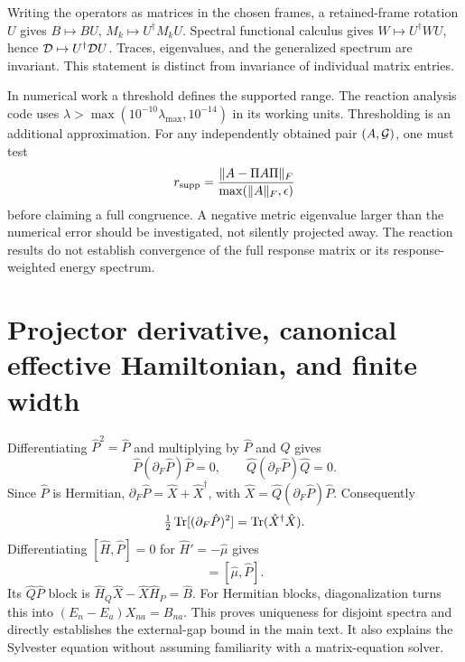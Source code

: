 \documentclass[aip,jcp,amsmath,amssymb,preprint,floatfix]{revtex4-1}
\begin{document}
Writing the operators as matrices in the chosen frames, a retained-frame rotation $U$ gives $B\mapsto BU$, $M_k\mapsto U^\dagger M_kU$. Spectral functional calculus gives $W\mapsto U^\dagger WU$, hence $\mathcal D\mapsto U^\dagger\mathcal D U$. Traces, eigenvalues, and the generalized spectrum are invariant. This statement is distinct from invariance of individual matrix entries.

In numerical work a threshold defines the supported range. The reaction analysis code uses $\lambda>\max(10^{-10}\lambda_{\max},10^{-14})$ in its working units. Thresholding is an additional approximation. For any independently obtained pair $(A,\mathcal G)$, one must test
\begin{equation}
r_{\rm supp}=\frac{\|A-\Pi A\Pi\|_F}{\max(\|A\|_F,\epsilon)}
\end{equation}
before claiming a full congruence. A negative metric eigenvalue larger than the numerical error should be investigated, not silently projected away. The reaction results do not establish convergence of the full response matrix or its response-weighted energy spectrum.

\section{Projector derivative, canonical effective Hamiltonian, and finite width}\label{sec:projector}
Differentiating $\hat{P}^2=\hat{P}$ and multiplying by $\hat{P}$ and $\hat{Q}$ gives
\begin{equation}
\hat{P}(\partial_F\hat{P})\hat{P}=0,\qquad \hat{Q}(\partial_F\hat{P})\hat{Q}=0.
\end{equation}
Since $\hat{P}$ is Hermitian, $\partial_F\hat{P}=\hat{X}+\hat{X}^\dagger$, with $\hat{X}=\hat{Q}(\partial_F\hat{P})\hat{P}$. Consequently
\begin{equation}
\tfrac12\operatorname{Tr}[(\partial_F\hat{P})^2]=\operatorname{Tr}(\hat{X}^\dagger \hat{X}).
\end{equation}
Differentiating $[\hat{H},\hat{P}]=0$ for $\hat{H}'=-\hat{\mu}$ gives
\begin{equation}
[\hat{H}_0,\partial_F\hat{P}]=[\hat{\mu},\hat{P}].
\end{equation}
Its $\hat{Q}\hat{P}$ block is $\hat{H}_Q\hat{X}-\hat{X}\hat{H}_P=\hat{B}$. For Hermitian blocks, diagonalization turns this into $(E_n-E_a)X_{na}=B_{na}$. This proves uniqueness for disjoint spectra and directly establishes the external-gap bound in the main text. It also explains the Sylvester equation without assuming familiarity with a matrix-equation solver.\cite{Kato1995,BartelsStewart1972}
\end{document}
